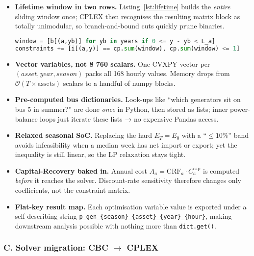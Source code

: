 \begin{itemize}
    \item \textbf{Lifetime window in two rows.}  
          Listing~\ref{lst:lifetime} builds the \emph{entire} sliding window once; CPLEX then recognises the
          resulting matrix block as totally unimodular, so branch-and-bound cuts quickly prune binaries.
          \begin{lstlisting}[language=Python, caption={Lifetime coupling snippet}, label={lst:lifetime}]
window = [b[(a,yb)] for yb in years if 0 <= y - yb < L_a]
constraints += [i[(a,y)] == cp.sum(window), cp.sum(window) <= 1]
          \end{lstlisting}
    \item \textbf{Vector variables, not 8 760 scalars.}  
          One CVXPY vector per $(asset, year, season)$ packs all 168 hourly values.  
          Memory drops from \(\mathcal{O}(T\! \times\! \text{assets})\) scalars to a handful of numpy blocks.
    \item \textbf{Pre-computed bus dictionaries.}  
          Look-ups like “which generators sit on bus 5 in summer?” are done \emph{once} in Python, then stored as lists; inner power-balance loops just iterate these lists → no expensive Pandas access.
    \item \textbf{Relaxed seasonal SoC.}  
          Replacing the hard $E_{T}=E_{0}$ with a “$\leq 10 \%$” band avoids infeasibility when a median week has net import or export; yet the inequality is still linear, so the LP relaxation stays tight.
    \item \textbf{Capital-Recovery baked in.}  
          Annual cost $A_a = \mathrm{CRF}_a \cdot C^{\text{cap}}_a$ is computed \emph{before} it reaches the solver.
          Discount-rate sensitivity therefore changes only coefficients, not the constraint matrix.
    \item \textbf{Flat-key result map.}  
          Each optimisation variable value is exported under a self-describing string  
          \texttt{p\_gen\_\{season\}\_\{asset\}\_\{year\}\_\{hour\}},  
          making downstream analysis possible with nothing more than \texttt{dict.get()}.
\end{itemize}

\subsubsection*{C.  Solver migration: CBC \(\rightarrow\) CPLEX}

